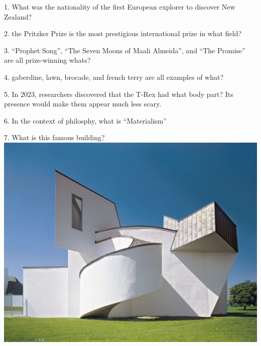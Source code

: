 \begin{frame}
\begin{center}
\Large
1. What was the nationality of the first European explorer to discover New Zealand?
\end{center}
\end{frame}
\begin{frame}
\begin{center}
\Large
2. the Pritzker Prize is the most prestigious international prize in what field?
\end{center}
\end{frame}
\begin{frame}
\begin{center}
\Large
3. ``Prophet Song'', ``The Seven Moons of Maali Almeida'', and ``The Promise'' are all prize-winning whats?
\end{center}
\end{frame}
\begin{frame}
\begin{center}
\Large
4. gaberdine, lawn, brocade, and french terry are all examples of what?
\end{center}
\end{frame}
\begin{frame}
\begin{center}
\Large
5. In 2023, researchers discovered that the T-Rex had what body part? Its presence would make them appear much less scary.
\end{center}
\end{frame}
\begin{frame}
\begin{center}
\Large
6. In the context of philosphy, what is ``Materialism''
\end{center}
\end{frame}
\begin{frame}
\begin{center}
\Large
7. What is this famous building?
\\
\vspace{0.5em}\includegraphics[height=0.6\paperheight]{images/vitra.jpg}
\end{center}
\end{frame}
